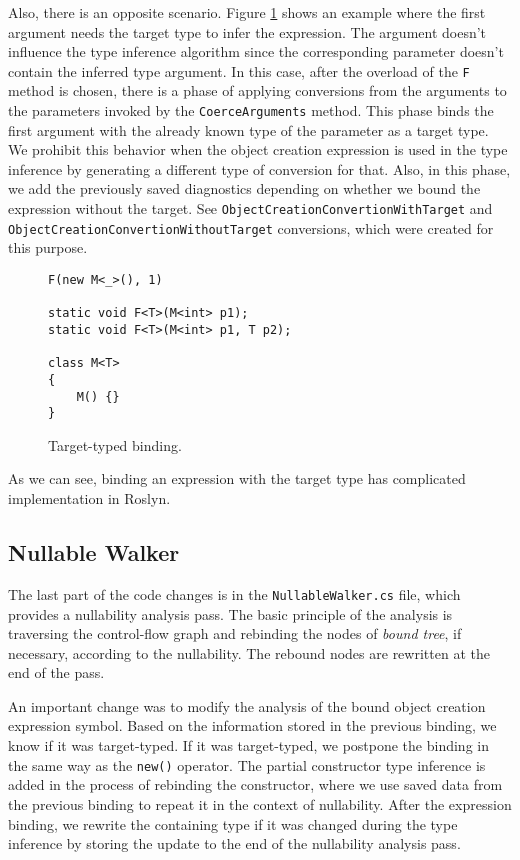 Also, there is an opposite scenario. 
Figure \ref{img72:targetBinding} shows an example where the first argument needs the target type to infer the expression. 
The argument doesn’t influence the type inference algorithm since the corresponding parameter doesn’t contain the inferred type argument. 
In this case, after the overload of the \texttt{F} method is chosen, there is a phase of applying conversions from the arguments to the parameters invoked by the \texttt{CoerceArguments} method. 
This phase binds the first argument with the already known type of the parameter as a target type.
We prohibit this behavior when the object creation expression is used in the type inference by generating a different type of conversion for that. 
Also, in this phase, we add the previously saved diagnostics depending on whether we bound the expression without the target. 
See \texttt{ObjectCreationConvertionWithTarget} and \texttt{ObjectCreationConvertionWithoutTarget} conversions, which were created for this purpose.
\begin{figure}[h]
\begin{lstlisting}[style=csharp, showstringspaces=false]
F(new M<_>(), 1)

static void F<T>(M<int> p1);
static void F<T>(M<int> p1, T p2);

class M<T> 
{
    M() {}
}
\end{lstlisting}
\caption{Target-typed binding.}
\label{img72:targetBinding}
\end{figure}
\par
As we can see, binding an expression with the target type has complicated implementation in Roslyn.

\subsection{Nullable Walker}

The last part of the code changes is in the \texttt{NullableWalker.cs} file, which provides a nullability analysis pass. 
The basic principle of the analysis is traversing the control-flow graph and rebinding the nodes of \textit{bound tree}, if necessary, according to the nullability. 
The rebound nodes are rewritten at the end of the pass.
\par
An important change was to modify the analysis of the bound object creation expression symbol. 
Based on the information stored in the previous binding, we know if it was target-typed. 
If it was target-typed, we postpone the binding in the same way as the \texttt{new()} operator. 
The partial constructor type inference is added in the process of rebinding the constructor, where we use saved data from the previous binding to repeat it in the context of nullability. 
After the expression binding, we rewrite the containing type if it was changed during the type inference by storing the update to the end of the nullability analysis pass.